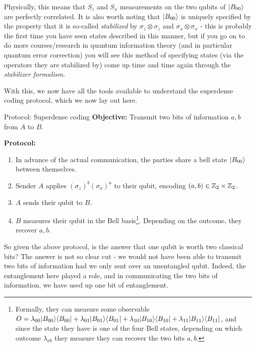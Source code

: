 Physically, this means that $S_z$ and $S_x$ measurements on the two qubits of $\lvert B_{00} \rangle$ are perfectly correlated. It is also worth noting that $\lvert B_{00} \rangle$ is uniquely specified by the property that it is so-called \emph{stabilized} by  $\sigma_z \otimes \sigma_z$ and $\sigma_x \otimes \sigma_x$ - this is probably the first time you have seen states described in this manner, but if you go on to do more courses/research in quantum information theory (and in particular quantum error correction) you will see this method of specifying states (via the operators they are stabilized by) come up time and time again through the \emph{stabilizer formalism}.


With this, we now have all the tools available to understand the superdense coding protocol, which we now lay out here.

\begin{blankbox}{Protocol: Superdense coding}
    \textbf{Objective:} Transmit two bits of information $a, b$ from $A$ to $B$. 

    \noindent
    \textbf{Protocol:}
    \begin{enumerate}
        \item In advance of the actual communication, the parties share a bell state $\lvert B_{00} \rangle$ between themselves.
        \item Sender $A$ applies $(\sigma_z)^b(\sigma_x)^a$ to their qubit, encoding $(a, b) \in \mathbb{Z}_2 \times \mathbb{Z}_2$. 
        \item $A$ sends their qubit to $B$.
        \item $B$ measures their qubit in the Bell basis\footnote{Formally, they can measure some observable $O = \lambda_{00}\lvert B_{00} \rangle \langle B_{00} \rvert + \lambda_{01}\lvert B_{01} \rangle \langle B_{01} \rvert + \lambda_{10}\lvert B_{10} \rangle \langle B_{10} \rvert + \lambda_{11}\lvert B_{11} \rangle \langle B_{11} \rvert$, and since the state they have is one of the four Bell states, depending on which outcome $\lambda_{ab}$ they measure they can recover the two bits $a, b$.}. Depending on the outcome, they recover $a ,b$.
    \end{enumerate}
\end{blankbox}

So given the above protocol, is the answer that one qubit is worth two classical bits? The answer is not so clear cut - we would not have been able to transmit two bits of information had we only sent over an unentangled qubit. Indeed, the entanglement here played a role, and in communicating the two bits of information, we have used up one bit of entanglement.

